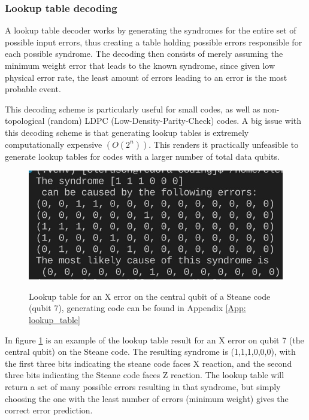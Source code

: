 \subsubsection{Lookup table decoding}
A lookup table decoder works by generating the 
syndromes for the entire set of possible input errors, thus creating a 
table holding possible errors responsible for each possible syndrome.
The decoding then consists of merely assuming the minimum weight
error that leads to the known syndrome, since given low physical 
error rate, the least amount of errors leading to an error is the most
probable event.

This decoding scheme is particularly useful for small codes, as well 
as non-topological (random) LDPC (Low-Density-Parity-Check) codes.
A big issue with this decoding scheme is that generating lookup tables is
extremely computationally expensive $(O(2^n))$. This renders it practically
unfeasible to generate lookup tables for codes with a larger number
of total data qubits.

\begin{figure}[h!]
	\begin{center}
	\captionsetup{justification=centering,margin=2cm}
	\includegraphics[scale=0.5]{./img/figures/X7errorlookup.png}\\
	\caption{Lookup table for an X error on the central qubit of
    a Steane code (qubit 7), generating code can be found in Appendix
    \ref{App: lookup_table}}
        
	\label{fig: lookup_table}
	\end{center}
\end{figure}

In figure \ref{fig: lookup_table} is an example of the lookup table result for
an X error on qubit 7 (the central qubit) on the Steane code. 
The resulting syndrome is (1,1,1,0,0,0), with the first three
bits indicating the steane code faces X reaction, and the second three bits
indicating the Steane code faces Z reaction. 
The lookup table will return a set of many possible errors resulting in 
that syndrome, but simply choosing the one with the least number of errors 
(minimum weight) gives the correct error prediction.